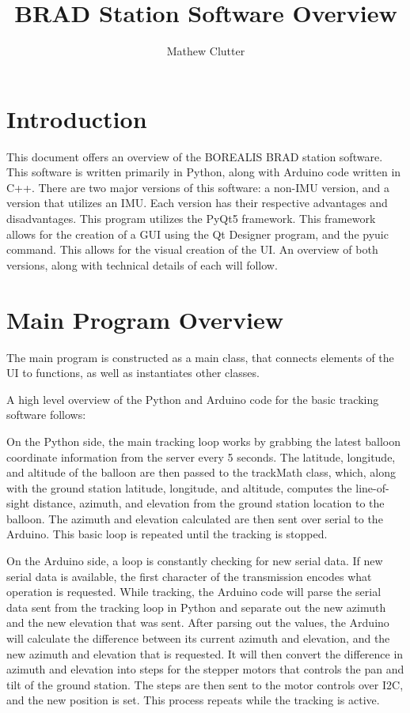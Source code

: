 \documentclass{article}
\title{BRAD Station Software Overview}
\author{Mathew Clutter }
\date{}
\begin{document}
\maketitle

\section{Introduction}
This document offers an overview of the BOREALIS BRAD station software. This software is written primarily in Python, along with Arduino code written in C++. There are two major versions of this software: a non-IMU version, and a version that utilizes an IMU. Each version has their respective advantages and disadvantages. This program utilizes the PyQt5 framework. This framework allows for the creation of a GUI using the Qt Designer program, and the pyuic command. This allows for the visual creation of the UI. An overview of both versions, along with technical details of each will follow. 

\section{Main Program Overview}
The main program is constructed as a main class, that connects elements of the UI to functions, as well as instantiates other classes. 

A high level overview of the Python and Arduino code for the basic tracking software follows:

On the Python side, the main tracking loop works by grabbing the latest balloon coordinate information from the server every 5 seconds. The latitude, longitude, and altitude of the balloon are then passed to the trackMath class, which, along with the ground station latitude, longitude, and altitude, computes the line-of-sight distance, azimuth, and elevation from the ground station location to the balloon. The azimuth and elevation calculated are then sent over serial to the Arduino. This basic loop is repeated until the tracking is stopped. 

On the Arduino side, a loop is constantly checking for new serial data. If new serial data is available, the first character of the transmission encodes what operation is requested. While tracking, the Arduino code will parse the serial data sent from the tracking loop in Python and separate out the new azimuth and the new elevation that was sent. After parsing out the values, the Arduino will calculate the difference between its current azimuth and elevation, and the new azimuth and elevation that is requested. It will then convert the difference in azimuth and elevation into steps for the stepper motors that controls the pan and tilt of the ground station. The steps are then sent to the motor controls over I2C, and the new position is set. This process repeats while the tracking is active. 
\end{document}

